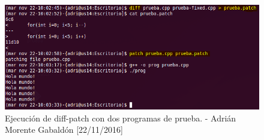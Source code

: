 \begin{figure}[H]
	\centering
	\includegraphics[scale=0.7]{diff-patch}
	\caption{Ejecución de diff-patch con dos programas de prueba. - Adrián Morente Gabaldón [22/11/2016]}
	\label{fig:figura22}
\end{figure}



